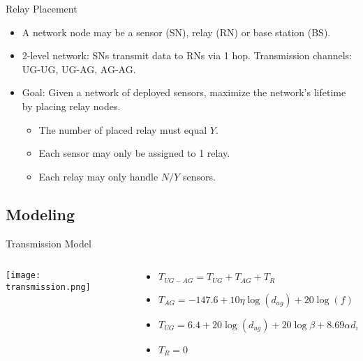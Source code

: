 \documentclass[main.tex]{subfiles}
\begin{document}
\begin{frame}{Relay Placement}
	\begin{itemize}
		\item A network node may be a sensor (SN), relay (RN) or base station (BS).
		\item 2-level network: SNs transmit data to RNs via 1 hop. Transmission channels: UG-UG, UG-AG, AG-AG.
		\pause
		\item {
			Goal: Given a network of deployed sensors, maximize the network's lifetime by placing relay nodes.
			\pause
			\begin{itemize}
				\item The number of placed relay must equal $Y$.
				\item Each sensor may only be assigned to 1 relay.
				\item Each relay may only handle $N/Y$ sensors.
			\end{itemize}
		}
	\end{itemize}
\end{frame}

\subsection{Modeling}
\begin{frame}{Transmission Model}
	\begin{columns}[T]
	\begin{column}{.48\textwidth}
		\begin{center}
			\texttt{[image: transmission.png]}
		\end{center}
	\end{column}	
	\hfill
	\begin{column}{.48\textwidth}
		\begin{itemize}
		 \item $T_{UG-AG} = T_{UG} + T_{AG} + T_R$
		 \item $T_{AG} = -147.6 + 10\eta\log(d_{ag}) + 20\log(f)$
		 \item $T_{UG} = 6.4 + 20\log(d_{ug}) + 20\log\beta + 8.69\alpha d_{ug}$
		 \item $T_R = 0$
		\end{itemize}
	\end{column}	
	\end{columns}
\end{frame}
\end{document}
